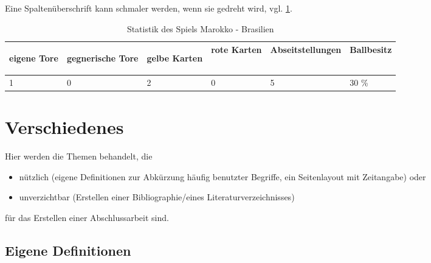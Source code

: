 Eine Spaltenüberschrift kann schmaler werden, wenn sie gedreht wird,
vgl. \cref{tab:marokko-brasilien-narrow}.
\begin{table}[htb]
    \centering%
    \caption{Statistik des Spiels Marokko - Brasilien}
    \label{tab:marokko-brasilien-narrow}
    \begin{tabular}{*{6}{l}}
      \toprule%
      \begin{sideways}    %
          eigene Tore
      \end{sideways} & \begin{rotate}{60} %
          gegnerische Tore
      \end{rotate} & \begin{turn}{30} %
          gelbe Karten
      \end{turn} & rote Karten &
                                 Abseitstellungen & Ballbesitz \\\midrule
      1 & 0 & 2 & 0 & 5 & 30 \% \\\bottomrule
    \end{tabular}
\end{table}


\section{Verschiedenes}

Hier werden die Themen behandelt, die
\begin{itemize}
  \item nützlich (eigene Definitionen zur Abkürzung häufig benutzter
    Begriffe, ein Seitenlayout mit Zeitangabe) oder
  \item unverzichtbar (Erstellen einer Bibliographie/eines
    Literaturverzeichnisses)
\end{itemize}
für das Erstellen einer Abschlussarbeit sind.

\subsection{Eigene Definitionen}%
\label{sec:eigene-definitionen}

